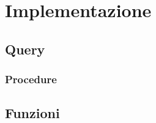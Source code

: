 \section{Implementazione}




\subsection{Query} %
\subsubsection{Procedure}

\begin{comment}
    operazione 3: stampa il nome e la quantità di tutti i cibi con data di scadenza al 10/12/2016
    opearzione 4: stampa la marca e il tipo di tutti i  vini o superalcolici, con annata risalente al 1987
    opearzione 5: stampa nome e PI di tutti i fornitori che vendono almeno 2 cibi con tipo "fresco"
    opearzione 6: stampa il codice e il costo di tutte le uscite con causale "acqua" in data 3/6/2015
    opearzione 7: stampa il codice e il costo di tutte le entrate del giorno 21/10/2016
    opearzione 8: stampa il codice e il numero di persone di tutti gli ordini serviti dalla cameriera "Anna" il giorno 15/04/2015 al tavolo "18" 
    operazione 9: stampa il numero di tutti i tavoli prenotati il giorno 31/12/2016 
    operazione 12: stampa il codice di tutte le prenotazioni per il tavolo numero 5 il giorno 24/08/2015
    operazione 16: stampa nome cognome di tutti i dipendenti di turno il lunedì
\end{comment}

\subsection{Funzioni} %

